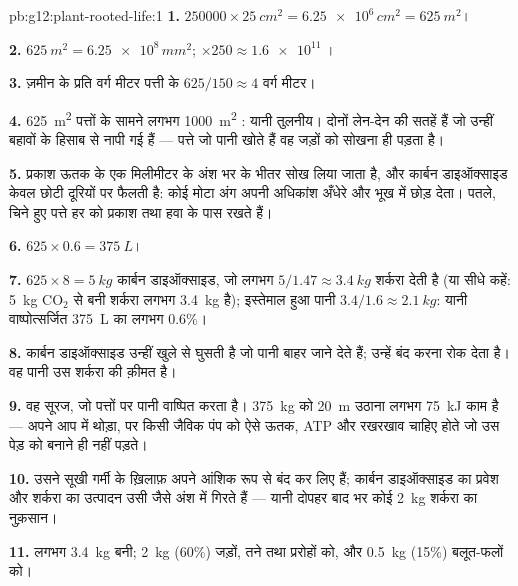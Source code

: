 \begin{solution}{pb:g12:plant-rooted-life:1}
\textbf{1.} $\num{250000} \times \qty{25}{cm^2} = \num{6.25e6}\,
\unit{cm^2} = \qty{625}{m^2}$।

\textbf{2.} $\qty{625}{m^2} = \num{6.25e8}\,\unit{mm^2}$; $\times 250
\approx \num{1.6e11}$ ।

\textbf{3.} ज़मीन के प्रति वर्ग मीटर पत्ती के $625/150 \approx 4$ वर्ग
मीटर।

\textbf{4.} \qty{625}{m^2} पत्तों के सामने लगभग \qty{1000}{m^2} :
यानी तुलनीय। दोनों लेन-देन की सतहें हैं जो उन्हीं बहावों के हिसाब से नापी
गई हैं --- पत्ते जो पानी खोते हैं वह जड़ों को सोखना ही पड़ता है।

\textbf{5.} प्रकाश ऊतक के एक मिलीमीटर के अंश भर के भीतर सोख लिया जाता है,
और कार्बन डाइऑक्साइड केवल छोटी दूरियों पर फैलती है: कोई मोटा अंग अपनी
अधिकांश  अँधेरे और भूख में छोड़ देता। पतले, चिने हुए पत्ते हर
 को प्रकाश तथा हवा के पास रखते हैं।

\textbf{6.} $625 \times 0.6 = \qty{375}{L}$।

\textbf{7.} $625 \times 8 = \qty{5}{kg}$ कार्बन डाइऑक्साइड, जो लगभग
$5/1.47 \approx \qty{3.4}{kg}$ शर्करा देती है (या सीधे कहें: \qty{5}{kg}
$\mathrm{CO_2}$ से बनी शर्करा लगभग \qty{3.4}{kg} है); इस्तेमाल हुआ पानी
$3.4/1.6 \approx \qty{2.1}{kg}$: यानी वाष्पोत्सर्जित \qty{375}{L} का लगभग
0.6\%।

\textbf{8.} कार्बन डाइऑक्साइड उन्हीं खुले  से घुसती है जो पानी बाहर
जाने देते हैं; उन्हें बंद करना  रोक देता है। वह पानी उस
शर्करा की क़ीमत है।

\textbf{9.} वह सूरज, जो पत्तों पर पानी वाष्पित करता है। \qty{375}{kg} को
\qty{20}{m} उठाना लगभग \qty{75}{kJ} काम है --- अपने आप में थोड़ा, पर किसी
जैविक पंप को ऐसे ऊतक, ATP और रखरखाव चाहिए होते जो उस पेड़ को बनाने ही नहीं
पड़ते।

\textbf{10.} उसने सूखी गर्मी के ख़िलाफ़ अपने  आंशिक रूप से बंद कर लिए
हैं; कार्बन डाइऑक्साइड का प्रवेश और शर्करा का उत्पादन उसी जैसे अंश में
गिरते हैं --- यानी दोपहर बाद भर कोई \qty{2}{kg} शर्करा का नुक़सान।

\textbf{11.} लगभग \qty{3.4}{kg} बनी; \qty{2}{kg} (60\%) जड़ों, तने तथा
प्ररोहों को, और \qty{0.5}{kg} (15\%) बलूत-फलों को।


\end{solution}
